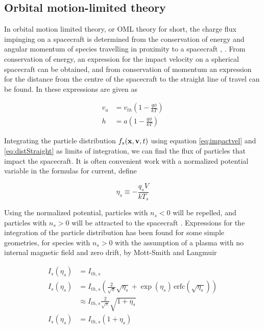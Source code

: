 \subsection*{Orbital motion-limited theory}
In orbital motion limited theory, or OML theory for short, the charge flux impinging on a spacecraft is determined from the conservation of energy and angular momentum of species travelling in proximity to a spacecraft \parencite{LAI2019}, \parencite{Garrett1981}. From conservation of energy, an expression for the impact velocity on a spherical spacecraft can be obtained, and from conservation of momentum an expression for the distance from the centre of the spacecraft to the straight line of travel can be found. In \parencite[Ch. 2.1]{LAI2019} these expressions are given as 

\begin{subequations}
    \begin{align}
        v_a &= v_{th} \left(1 - \frac{q \phi}{kT} \right) \label{eq:impactvel} \\
        h &= a \left(1 - \frac{q \phi}{kT} \right) \label{eq:distStraight}
    \end{align}
\end{subequations}

Integrating the particle distribution $f_s(\vb{x}, \vb{v}, t)$ using equation \eqref{eq:impactvel} and \eqref{eq:distStraight} as limits of integration, we can find the flux of particles that impact the spacecraft. It is often convenient work with a normalized potential variable in the formulas for current, define

\begin{equation}\label{eq:normPot}
    \eta_s \equiv - \frac{q_s V}{k T_s}
\end{equation}

Using the normalized potential, particles with $n_s < 0$ will be repelled, and particles with $n_s > 0$ will be attracted to the spacecraft \parencite{Marholm2019}. Expressions for the integration of the particle distribution has been found for some simple geometries, for species with $n_s > 0$ with the assumption of a plasma with no internal magnetic field and zero drift, by Mott-Smith and Langmuir \parencite{Mott-Smith1926}

\begin{subequations}
    \begin{align}
        I_s (\eta_s) &= I_{th,s} \label{eq:IPlane} \\
        I_s (\eta_s) &= I_{th,s} \left(\frac{2}{\sqrt{\pi}} \sqrt{\eta_s} + \exp(\eta_s) \hspace{2pt} \text{erfc}(\sqrt{\eta_s}) \right) \label{eq:ICylinder}\\
        & \approx I_{th,s} \frac{2}{\sqrt{\pi}} \sqrt{1 + \eta_s} \\
        I_s(\eta_s)  &= I_{th,s} (1 + \eta_s) \label{eq:Isphere}
    \end{align}
\end{subequations}

